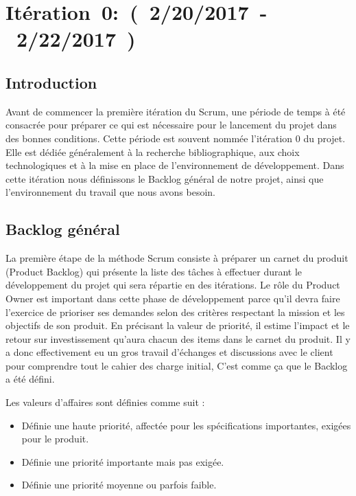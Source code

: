 \section{Itération~0:~(~2/20/2017~-~2/22/2017~)}

\subsection*{Introduction}
Avant de commencer la première itération du Scrum, une période de temps à été
consacrée pour préparer ce qui est nécessaire pour le lancement du projet dans des
bonnes conditions. 
Cette période est souvent nommée l'itération 0 du projet.
Elle est dédiée généralement à la recherche bibliographique, aux choix
technologiques et à la mise en place de l'environnement de développement.
Dans cette itération nous définissons le Backlog général 
de notre projet, ainsi que l'environnement du travail que nous avons besoin.

\subsection{Backlog général}

La première étape de la méthode Scrum consiste à préparer un carnet du produit
(Product Backlog) qui présente la liste des tâches à effectuer durant le
développement du projet qui sera répartie en des itérations. Le rôle du
Product Owner est important dans cette phase de développement parce qu'il devra
faire l'exercice de prioriser ses demandes selon des critères respectant la
mission et les objectifs de son produit. En précisant la valeur de priorité, il
estime l'impact et le retour sur investissement qu'aura chacun des items dans
le carnet du produit. Il y a donc effectivement eu un gros travail d'échanges
et discussions avec le client pour comprendre tout le cahier des charge
initial, C'est comme ça que le Backlog a été défini.

Les valeurs d'affaires sont définies comme suit :
\begin{description}[align=right,labelwidth=1cm]
    \item [1] 
    \begin{itemize}
     \item  Définie une haute priorité, affectée pour les spécifications
        importantes, exigées pour le produit.
    \end{itemize}

    \item [2] 
    \begin{itemize}
     \item Définie une priorité importante mais pas exigée.
    \end{itemize}
    \item [3]
      \begin{itemize}
     \item  Définie une priorité moyenne ou parfois faible.
    \end{itemize}
   
\end{description}

